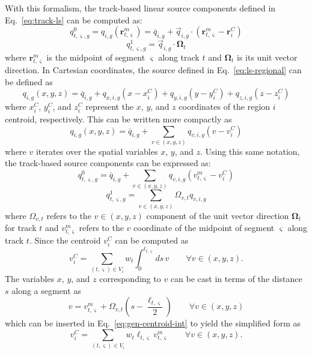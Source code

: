 With this formalism, the track-based linear source components defined in Eq.~\ref{eq:track-ls} can be computed as:
\begin{equation}
q^0_{t,\varsigma,g} = q_{i,g}(\mathbf{r}^m_{t,\varsigma}) = \overline{q}_{i,g} + \vec{q}_{i,g} \cdot \left( \mathbf{r}^m_{t,\varsigma} - \mathbf{r}^C_i \right)
\end{equation}
\begin{equation}
q^1_{t,\varsigma,g} = \vec{q}_{i,g} \cdot \mathbf{\Omega}_t
\end{equation}
where $\mathbf{r}^m_{t,\varsigma}$ is the midpoint of segment $\varsigma$ along track $t$ and $\mathbf{\Omega}_t$ is its unit vector direction. In Cartesian coordinates, the source defined in Eq.~\ref{eq:ls-regional} can be defined as
\begin{equation}
q_{i,g}(x, y, z) = \overline{q}_{i,g} + q_{x,i,g} \left( x - x^C_i \right) + q_{y,i,g} \left( y - y^C_i \right) + q_{z,i,g} \left( z - z^C_i \right)
\end{equation}
where $x^C_i$, $y^C_i$, and $z^C_i$ represent the $x$, $y$, and $z$ coordinates of the region $i$ centroid, respectively. This can be written more compactly as
\begin{equation}
q_{i,g}(x, y, z) = \overline{q}_{i,g} + \sum_{v \in (x,y,z)} q_{v,i,g} \left( v - v^C_i \right)
\end{equation}
where $v$ iterates over the spatial variables $x$, $y$, and $z$. Using this same notation, the track-based source components can be expressed as:
\begin{equation}
q^0_{t,\varsigma,g} = \overline{q}_{i,g} + \sum_{v \in (x,y,z)} q_{v,i,g} \left( v^m_{t,\varsigma} - v^C_i \right)
\end{equation}
\begin{equation}
q^1_{t,\varsigma,g} = \sum_{v \in (x,y,z)} \Omega_{v,t} q_{v,i,g}
\end{equation}
where $\Omega_{v,t}$ refers to the $v\in(x,y,z)$ component of the unit vector direction $\mathbf{\Omega}_t$ for track $t$ and $v^m_{t,\varsigma}$ refers to the $v$ coordinate of the midpoint of segment $\varsigma$ along track $t$. Since the centroid $v^C_i$ can be computed as
\begin{equation}
v^C_i = \sum_{(t,\varsigma) \in V_i} w_t \int_{0}^{\ell_{t,\varsigma}} ds \, v \qquad \forall v \in (x,y,z).
\label{eq:gen-centroid-int}
\end{equation}
The variables $x$, $y$, and $z$ corresponding to $v$ can be cast in terms of the distance $s$ along a segment as
\begin{equation}
v = v^m_{t,\varsigma} + \Omega_{v,t} \left(s - \frac{\ell_{t,\varsigma}}{2} \right) \qquad \forall v \in (x,y,z)
\label{eq:v-to-s}
\end{equation}
which can be inserted in Eq.~\ref{eq:gen-centroid-int} to yield the simplified form as
\begin{equation}
v^C_i = \sum_{(t,\varsigma) \in V_i} w_t \ell_{t,\varsigma} v^m_{t,\varsigma} \qquad \forall v \in (x,y,z).
\end{equation}

